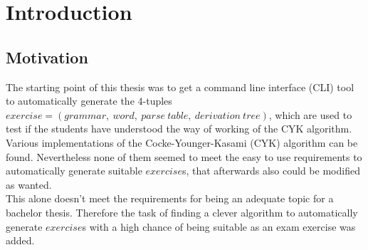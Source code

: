 
\section{Introduction}\label{Introduction}

\subsection{Motivation}

The starting point of this thesis was to get a command line interface (CLI) tool to automatically generate the 4-tuples $exercise = (grammar,\ word,\ parse\ table,\ derivation\ tree)$, which are used to test if the students have understood the way of working of the CYK algorithm.\\
Various implementations of the Cocke-Younger-Kasami (CYK) algorithm can be found. Nevertheless none of them seemed to meet the easy to use requirements to automatically generate suitable $exercise$s, that afterwards also could be modified as wanted.\\
This alone doesn't meet the requirements for being an adequate topic for a bachelor thesis. Therefore the task of finding a clever algorithm to automatically generate $exercise$s with a high chance of being suitable as an exam exercise was added. 

